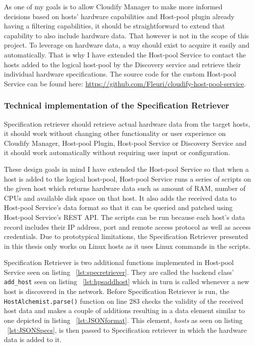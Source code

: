 As one of my goals is to allow Cloudify Manager to make more informed decisions based on hosts' hardware capabilities and Host-pool plugin already having a filtering capabilities, it should be straightforward to extend that capability to also include hardware data. That however is not in the scope of this project. To leverage on hardware data, a way should exist to acquire it easily and automatically. That is why I have extended the Host-pool Service to contact the hosts added to the logical host-pool by the Discovery service and retrieve their individual hardware specifications. The source code for the custom Host-pool Service can be found here: \url{https://github.com/Fleuri/cloudify-host-pool-service}.

\subsubsection{Technical implementation of the Specification Retriever}

Specification retriever should retrieve actual hardware data from the target hosts, it should work without changing other functionality or user experience on Cloudify Manager, Host-pool Plugin, Host-pool Service or Discovery Service and it should work automatically without requiring user input or configuration.

These design goals in mind I have extended the Host-pool Service so that when a host is added to the logical host-pool, Host-pool Service runs a series of scripts on the given host which returns hardware data such as amount of RAM, number of CPUs and available disk space on that host.
It also adds the received data to Host-pool Service's data format so that it can be queried and patched using Host-pool Service's REST API. The scripts can be run because each host's data record includes their IP address, port and remote access protocol as well as access credentials. Due to prototypical limitations, the Specification Retriever presented in this thesis only works on Linux hosts as it uses Linux commands in the scripts.

\pagebreak



Specification Retriever is two additional functions implemented in Host-pool Service seen on listing ~\ref{lst:specretriever}. They are called the backend class' \verb|add_host| seen on listing ~\ref{lst:hpsaddhost} which in turn is called whenever a new host is discovered in the network. Before Specification Retriever is run, the \verb|HostAlchemist.parse()| function on line 283 checks the validity of the received host data and makes a couple of additions resulting in a data element similar to one depicted in listing ~\ref{lst:JSONformat}. This element, \textit{hosts} as seen on listing ~\ref{lst:JSONSpecs}, is then passed to Specification retriever in which the hardware data is added to it.

